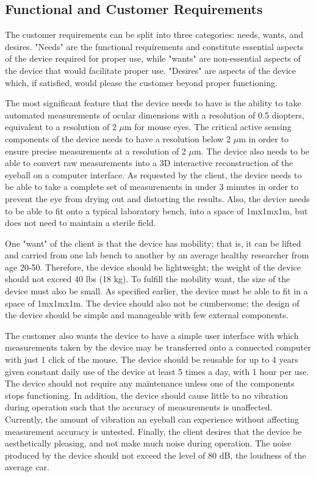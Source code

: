 \documentclass{article}
\begin{document}
\subsection{Functional and Customer Requirements}
The customer requirements can be split into three categories: needs, wants, and desires. "Needs" are the functional requirements and constitute essential aspects of the device required for proper use, while "wants" are non‐essential aspects of the device that would facilitate proper use. "Desires" are aspects of the device which, if satisfied, would please the customer beyond proper functioning.  

The most significant feature that the device needs to have is the ability to take automated measurements of ocular dimensions with a resolution of 0.5 diopters, equivalent to a resolution of 2 $\mu$m for mouse eyes. The critical active sensing components of the device needs to have a resolution below 2 $\mu$m in order to ensure precise measurements at a resolution of 2 $\mu$m. The device also needs to be able to convert raw measurements into a 3D interactive reconstruction of the eyeball on a computer interface. As requested by the client, the device needs to be able to take a complete set of measurements in under 3 minutes in order to prevent the eye from drying out and distorting the results. Also, the device needs to be able to fit onto a typical laboratory bench, into a space of 1mx1mx1m, but does not need to maintain a sterile field.      

One "want" of the client is that the device has mobility; that is, it can be lifted and carried from one lab bench to another by an average healthy researcher from age 20‐50. Therefore, the device should be lightweight; the weight of the device should not exceed 40 lbs (18 kg)\cite{gross03}. To fulfill the mobility want, the size of the device must also be small. As specified earlier, the device must be able to fit in a space of 1mx1mx1m. The device should also not be cumbersome; the design of the device should be simple and manageable with few external components.

The customer also wants the device to have a simple user interface with which measurements taken by the device may be transferred onto a connected computer with just 1 click of the mouse. The device should  be reusable for up to 4 years given constant daily use of the device at least 5 times a day, with 1 hour per use\cite{keyence01}. The device should not require any maintenance unless one of the components stops functioning\cite{keyence01}. In addition, the device should cause little to no vibration during operation such that the accuracy of measurements is unaffected. Currently, the amount of vibration an eyeball can experience without affecting measurement accuracy is untested. Finally, the client desires that the device be aesthetically pleasing, and not make much noise during operation. The noise produced by the device should not exceed the level of 80 dB, the loudness of the average car\cite{truax09}.  
\end{document}
